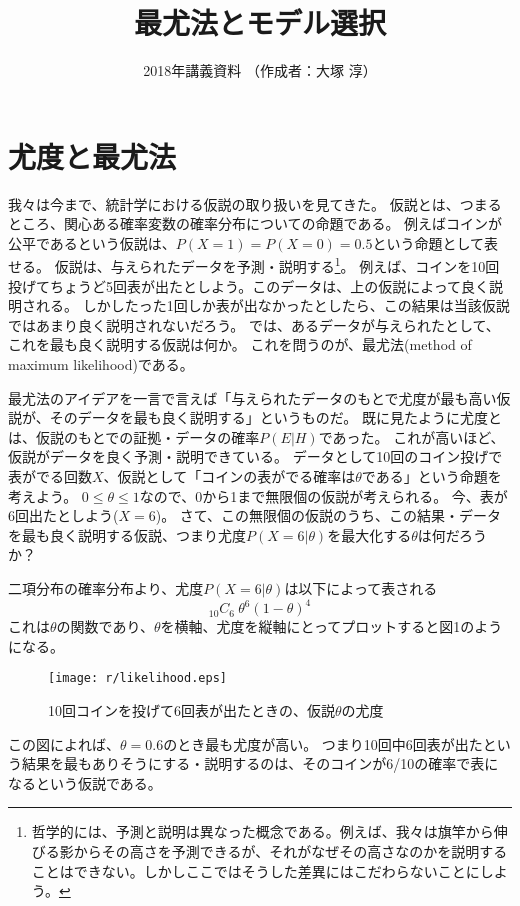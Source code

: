 \documentclass{jsarticle}
\title{最尤法とモデル選択}
\author{2018年講義資料 （作成者：大塚 淳）}
\date{ }                                           %
\begin{document}
\maketitle
\section{尤度と最尤法}
我々は今まで、統計学における仮説の取り扱いを見てきた。
仮説とは、つまるところ、関心ある確率変数の確率分布についての命題である。
例えばコインが公平であるという仮説は、$P(X=1)=P(X=0)=0.5$という命題として表せる。
仮説は、与えられたデータを予測・説明する\footnote{哲学的には、予測と説明は異なった概念である。例えば、我々は旗竿から伸びる影からその高さを予測できるが、それがなぜその高さなのかを説明することはできない。しかしここではそうした差異にはこだわらないことにしよう。}。
例えば、コインを10回投げてちょうど5回表が出たとしよう。このデータは、上の仮説によって良く説明される。
しかしたった1回しか表が出なかったとしたら、この結果は当該仮説ではあまり良く説明されないだろう。
では、あるデータが与えられたとして、これを最も良く説明する仮説は何か。
これを問うのが、最尤法(method of maximum likelihood)である。

最尤法のアイデアを一言で言えば「与えられたデータのもとで尤度が最も高い仮説が、そのデータを最も良く説明する」というものだ。
既に見たように尤度とは、仮説のもとでの証拠・データの確率$P(E|H)$であった。
これが高いほど、仮説がデータを良く予測・説明できている。
データとして10回のコイン投げで表がでる回数$X$、仮説として「コインの表がでる確率は$\theta$である」という命題を考えよう。
$0 \leq \theta \leq 1$なので、0から1まで無限個の仮説が考えられる。
今、表が6回出たとしよう($X=6$)。
さて、この無限個の仮説のうち、この結果・データを最も良く説明する仮説、つまり尤度$P(X=6|\theta)$を最大化する$\theta$は何だろうか？

二項分布の確率分布より、尤度$P(X=6|\theta)$は以下によって表される
\begin{equation}
 {}_{10} C_{6} \ \theta^6 (1-\theta)^4
\end{equation}
これは$\theta$の関数であり、$\theta$を横軸、尤度を縦軸にとってプロットすると図1のようになる。
\begin{figure}[h]
 \centering
 \texttt{[image: r/likelihood.eps]}
 \caption{10回コインを投げて6回表が出たときの、仮説$\theta$の尤度}
\end{figure}
この図によれば、$\theta=0.6$のとき最も尤度が高い。
つまり10回中6回表が出たという結果を最もありそうにする・説明するのは、そのコインが6/10の確率で表になるという仮説である。
\end{document}
